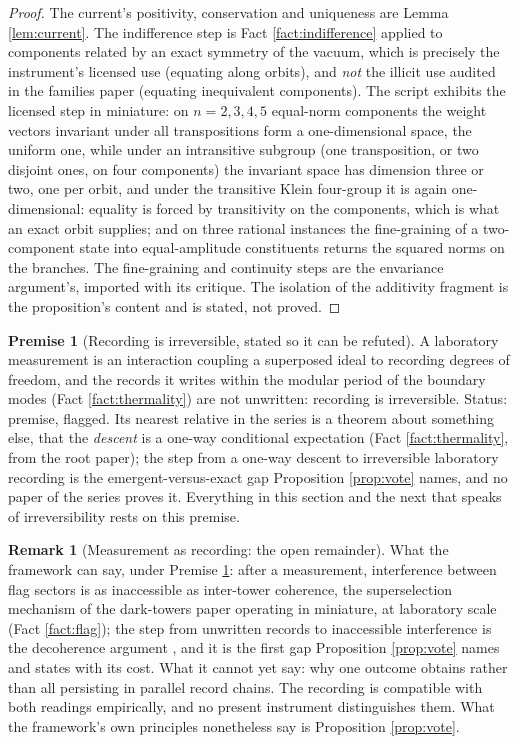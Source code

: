 \documentclass[11pt]{article}
\theoremstyle{definition}
\newtheorem{remark}[theorem]{Remark}
\newtheorem{premise}[theorem]{Premise}
\begin{document}
\begin{proof}
The current's positivity, conservation and uniqueness are Lemma \ref{lem:current}. The indifference step is Fact \ref{fact:indifference} applied to components related by an exact symmetry of the vacuum, which is precisely the instrument's licensed use (equating along orbits), and \emph{not} the illicit use audited in the families paper (equating inequivalent components). The script exhibits the licensed step in miniature: on $n = 2, 3, 4, 5$ equal-norm components the weight vectors invariant under all transpositions form a one-dimensional space, the uniform one, while under an intransitive subgroup (one transposition, or two disjoint ones, on four components) the invariant space has dimension three or two, one per orbit, and under the transitive Klein four-group it is again one-dimensional: equality is forced by transitivity on the components, which is what an exact orbit supplies; and on three rational instances the fine-graining of a two-component state into equal-amplitude constituents returns the squared norms on the branches. The fine-graining and continuity steps are the envariance argument's, imported with its critique. The isolation of the additivity fragment is the proposition's content and is stated, not proved.
\end{proof}

\begin{premise}[Recording is irreversible, stated so it can be refuted]\label{prem:recording}
A laboratory measurement is an interaction coupling a superposed ideal to recording degrees of freedom, and the records it writes within the modular period of the boundary modes (Fact \ref{fact:thermality}) are not unwritten: recording is irreversible. Status: premise, flagged. Its nearest relative in the series is a theorem about something else, that the \emph{descent} is a one-way conditional expectation (Fact \ref{fact:thermality}, from the root paper); the step from a one-way descent to irreversible laboratory recording is the emergent-versus-exact gap Proposition \ref{prop:vote} names, and no paper of the series proves it. Everything in this section and the next that speaks of irreversibility rests on this premise.
\end{premise}

\begin{remark}[Measurement as recording: the open remainder]\label{rem:recording}
What the framework can say, under Premise \ref{prem:recording}: after a measurement, interference between flag sectors is as inaccessible as inter-tower coherence, the superselection mechanism of the dark-towers paper operating in miniature, at laboratory scale (Fact \ref{fact:flag}); the step from unwritten records to inaccessible interference is the decoherence argument \cite{Zeh1970, JoosZeh1985}, and it is the first gap Proposition \ref{prop:vote} names and states with its cost. What it cannot yet say: why one outcome obtains rather than all persisting in parallel record chains. The recording is compatible with both readings empirically, and no present instrument distinguishes them. What the framework's own principles nonetheless say is Proposition \ref{prop:vote}.
\end{remark}
\end{document}
